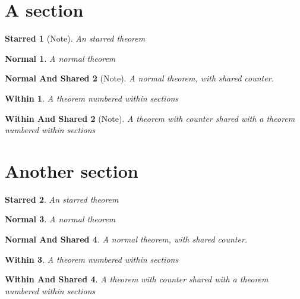 \documentclass{article}
\theoremstyle{redPlain}
\newtheorem*{starred}{Starred}
\newtheorem{normal}{Normal}
\newtheorem{normalshared}[normal]{Normal And Shared}
\theoremstyle{plain}
\newtheorem{within}{Within}[section]
\newtheorem{withinshared}[within]{Within And Shared}
\begin{document}
\section{A section}
\begin{starred}[Note]
    An starred theorem
\end{starred}
\begin{normal}
    A normal theorem
\end{normal}
\begin{normalshared}[Note]
    A normal theorem, with shared counter.
\end{normalshared}
\begin{within}
    A theorem numbered within sections
\end{within}
\begin{withinshared}[Note]
    A theorem with counter shared with a theorem numbered within sections
\end{withinshared}
\section{Another section}
\begin{starred}
    An starred theorem
\end{starred}
\begin{normal}
    A normal theorem
\end{normal}
\begin{normalshared}
    A normal theorem, with shared counter.
\end{normalshared}
\begin{within}
    A theorem numbered within sections
\end{within}
\begin{withinshared}\label{T:1}
    A theorem with counter shared with a theorem numbered within sections
\end{withinshared}
\end{document}
